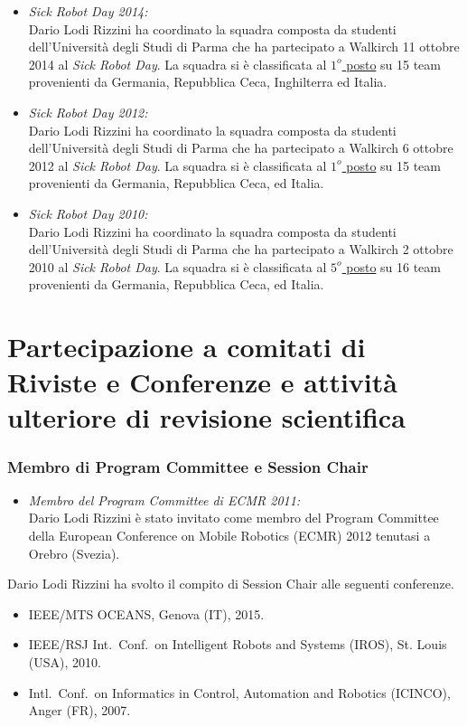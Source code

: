 \documentclass[11pt]{article}
\newcommand{\ITEMDATE}[1]{\item \textit{#1:}\\}
\begin{document}
\begin{itemize}

\ITEMDATE{Sick Robot Day 2014}
Dario Lodi Rizzini ha coordinato la squadra composta da studenti dell'Universit\`a degli Studi di Parma
che ha partecipato a Walkirch 11 ottobre 2014 al \emph{Sick Robot Day}.
La squadra si \`e classificata al \underline{$1^o$ posto} su 15 team provenienti da Germania, Repubblica Ceca,
Inghilterra ed Italia. 

\ITEMDATE{Sick Robot Day 2012}
Dario Lodi Rizzini ha coordinato la squadra composta da studenti dell'Universit\`a degli Studi di Parma
che ha partecipato a Walkirch 6 ottobre 2012 al \emph{Sick Robot Day}.
La squadra si \`e classificata al \underline{$1^o$ posto} su 15 team provenienti da Germania, Repubblica Ceca,
ed Italia. 

\ITEMDATE{Sick Robot Day 2010}
Dario Lodi Rizzini ha coordinato la squadra composta da studenti dell'Universit\`a degli Studi di Parma
che ha partecipato a Walkirch 2 ottobre 2010 al \emph{Sick Robot Day}.
La squadra si \`e classificata al \underline{$5^o$ posto} su 16 team provenienti da Germania, Repubblica Ceca,
ed Italia. 

\end{itemize}


\section*{Partecipazione a comitati di Riviste e Conferenze e attivit\`a ulteriore di revisione scientifica}

\subsubsection*{Membro di Program Committee e Session Chair}

\begin{itemize}
\ITEMDATE{Membro del Program Committee di ECMR 2011}
Dario Lodi Rizzini \`e stato invitato come membro del Program Committee della European Conference on Mobile Robotics (ECMR) 2012
tenutasi a Orebro (Svezia). 
\end{itemize}

Dario Lodi Rizzini ha svolto il compito di Session Chair alle seguenti conferenze.
\begin{itemize}
\item IEEE/MTS OCEANS, Genova (IT), 2015. 
\item IEEE/RSJ Int.~Conf.~on Intelligent Robots and Systems (IROS), St. Louis (USA), 2010.
\item Intl.~Conf.~on Informatics in Control, Automation and Robotics (ICINCO), Anger (FR), 2007.
\end{itemize}
\end{document}

